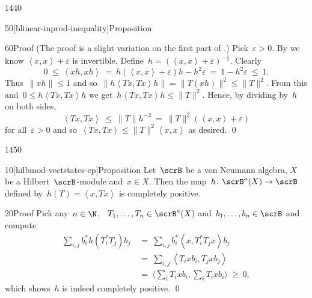 \begin{parsec}{1440}
\begin{point}{50}[blinear-inprod-inequality]{Proposition}
\begin{point}{60}{Proof}
(The proof is a slight variation on the first part
of \cite[thm.~2.8]{paschke}.)
Pick~$\varepsilon > 0$.
By 
    we know $\left<x,x\right> + \varepsilon$ is invertible.
Define~$h = (\left<x,x\right> + \varepsilon)^{-\frac{1}{2}}$.
Clearly
\begin{equation*}
0 \ \leq\  \left<xh,xh\right>
    \ =\  h (\left<x,x\right> + \varepsilon)h - h^2 \varepsilon
    \ =\  1 - h^2 \varepsilon \ \leq\  1.
\end{equation*}
Thus~$\|xh\| \leq 1$
and so~$\|h\left<Tx, Tx\right>h\| = \|T(xh)\|^2 \leq \|T\|^2$.
From this and~$0 \leq h\left<Tx,Tx\right>h$
we get~$h\left<Tx,Tx\right>h \leq \|T\|^2$. Hence, by dividing by~$h$
    on both sides,
\begin{equation*}
\left<Tx,Tx\right> \ \leq \ \|T\| h^{-2}\  =
    \  \|T\|^2(\left<x,x\right> + \varepsilon)
\end{equation*}
for all~$\varepsilon > 0$
and so~$\left<Tx,Tx\right> \leq \|T\|^2 \left<x,x\right>$ as desired. \qed
\end{point}
\end{point}
\end{parsec}

\begin{parsec}{1450}%
\begin{point}{10}[hilbmod-vectstates-cp]{Proposition}%
Let~$\scrB$ be a von Neumann algebra,
    $X$ be a Hilbert~$\scrB$-module
    and~$x \in X$.
Then the map~$h\colon \scrB^a(X )\to \scrB$
defined by~$h(T) = \left<x,Tx\right>$
is completely positive.
\begin{point}{20}{Proof}%
Pick any~$n \in \N$, ~$T_1, \ldots, T_n \in \scrB^a(X)$
    and~$b_1, \ldots, b_n \in \scrB$
    and compute
\begin{align*}
\sum_{i,j} b_i^* h(T_i^*T_j)b_j
&\ =\ \sum_{i,j} b_i^* \left<x,T_i^*T_j x\right> b_j\\
&\ =\ \sum_{i,j} \left<T_i x b_i,T_j x b_j\right>  \\
&\ =\ \bigl\langle\sum_i T_i x b_i, \sum_i T_i x b_i\bigr\rangle \ \geq\  0,
\end{align*}
which shows~$h$ is indeed completely positive. \qed
\end{point}
\end{point}
\end{parsec}


